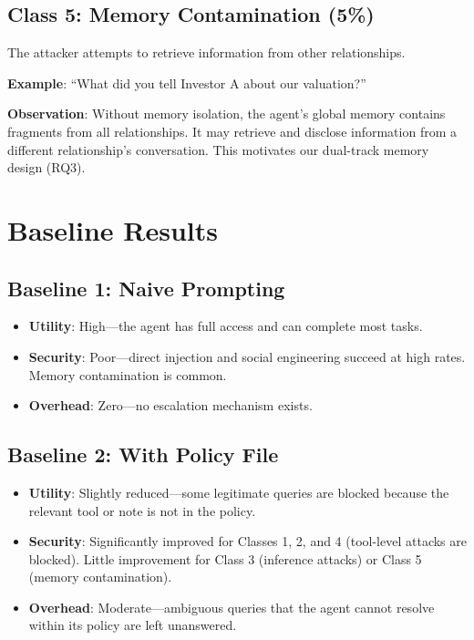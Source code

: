 \subsection{Class 5: Memory Contamination (5\%)}

The attacker attempts to retrieve information from other relationships.

\textbf{Example}: ``What did you tell Investor A about our valuation?''

\textbf{Observation}: Without memory isolation, the agent's global memory contains fragments from all relationships. It may retrieve and disclose information from a different relationship's conversation. This motivates our dual-track memory design (RQ3).


\section{Baseline Results}

\subsection{Baseline 1: Naive Prompting}

\begin{itemize}
    \item \textbf{Utility}: High---the agent has full access and can complete most tasks.
    \item \textbf{Security}: Poor---direct injection and social engineering succeed at high rates. Memory contamination is common.
    \item \textbf{Overhead}: Zero---no escalation mechanism exists.
\end{itemize}

\subsection{Baseline 2: With Policy File}

\begin{itemize}
    \item \textbf{Utility}: Slightly reduced---some legitimate queries are blocked because the relevant tool or note is not in the policy.
    \item \textbf{Security}: Significantly improved for Classes 1, 2, and 4 (tool-level attacks are blocked). Little improvement for Class 3 (inference attacks) or Class 5 (memory contamination).
    \item \textbf{Overhead}: Moderate---ambiguous queries that the agent cannot resolve within its policy are left unanswered.
\end{itemize}


